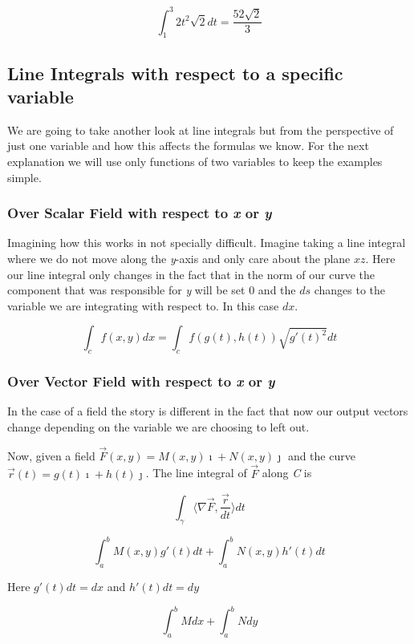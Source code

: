 \[
    \int_{1}^{3}  2t^2 \sqrt{2}dt = \frac{52\sqrt{2}}{3} 
\]

\subsection{Line Integrals with respect to a specific variable}

We are going to take another look at line integrals but from the perspective of just one variable and how 
this affects the formulas we know. For the next explanation we will use only functions of two variables 
to keep the examples simple.

\subsubsection{Over Scalar Field with respect to \emph{x} or \emph{y}}

Imagining how this works in not specially difficult. Imagine taking a line integral where we do not move 
along the \emph{y}-axis and only care about the plane \(xz\). Here our line integral only changes in the 
fact that in the norm of our curve the component that was responsible for \emph{y} will be set 0 and the 
\(ds\) changes to the variable we are integrating with respect to. In this case \(dx\).

\[
    \int_{c} f(x,y)dx = \int_{c} f(g(t), h(t)) \sqrt{g'(t)^2}dt 
\]

\subsubsection{Over Vector Field with respect to \emph{x} or \emph{y}}

In the case of a field the story is different in the fact that now our output vectors change depending 
on the variable we are choosing to left out.
\vspace{\baselineskip}

Now, given a field \(\vec{F}(x,y) = M(x,y)\imath + N(x,y)\jmath\) and the curve
 \(\vec{r}(t) = g(t)\imath + h(t)\jmath\). The line integral of \(\vec{F}\) along \emph{C} is 

\[
    \int_\gamma \langle \nabla \vec{F}, \frac{\vec{r}}{dt} \rangle dt
\]

\[
    \int_{a}^{b} M(x,y)g'(t)dt + \int_{a}^{b} N(x,y)h'(t)dt
\]

Here \(g'(t)dt = dx\) and \(h'(t)dt = dy\)

\[
    \int_{a}^{b} Mdx + \int_{a}^{b} Ndy
\]


